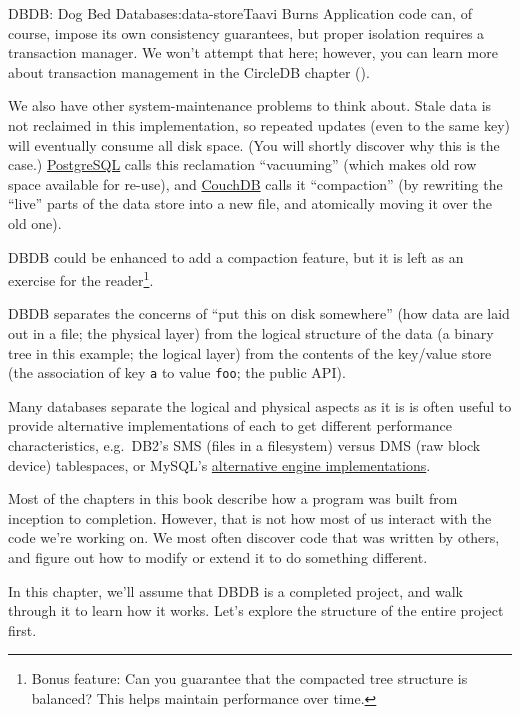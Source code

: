 \begin{aosachapter}{DBDB: Dog Bed Database}{s:data-store}{Taavi Burns}
Application code can, of course, impose its own consistency guarantees,
but proper isolation requires a transaction manager. We won't attempt
that here; however, you can learn more about transaction management in
the CircleDB chapter ().

We also have other system-maintenance problems to think about. Stale
data is not reclaimed in this implementation, so repeated updates (even
to the same key) will eventually consume all disk space. (You will
shortly discover why this is the case.)
\href{http://www.postgresql.org/}{PostgreSQL} calls this reclamation
``vacuuming'' (which makes old row space available for re-use), and
\href{http://couchdb.apache.org/}{CouchDB} calls it ``compaction'' (by
rewriting the ``live'' parts of the data store into a new file, and
atomically moving it over the old one).

DBDB could be enhanced to add a compaction feature, but it is left as an
exercise for the reader\footnote{Bonus feature: Can you guarantee that
  the compacted tree structure is balanced? This helps maintain
  performance over time.}.

\label{the-architecture-of-dbdb}

DBDB separates the concerns of ``put this on disk somewhere'' (how data
are laid out in a file; the physical layer) from the logical structure
of the data (a binary tree in this example; the logical layer) from the
contents of the key/value store (the association of key \texttt{a} to
value \texttt{foo}; the public API).

Many databases separate the logical and physical aspects as it is is
often useful to provide alternative implementations of each to get
different performance characteristics, e.g.~DB2's SMS (files in a
filesystem) versus DMS (raw block device) tablespaces, or MySQL's
\href{http://dev.mysql.com/doc/refman/5.7/en/storage-engines.html}{alternative
engine implementations}.

\label{discovering-the-design}

Most of the chapters in this book describe how a program was built from
inception to completion. However, that is not how most of us interact
with the code we're working on. We most often discover code that was
written by others, and figure out how to modify or extend it to do
something different.

In this chapter, we'll assume that DBDB is a completed project, and walk
through it to learn how it works. Let's explore the structure of the
entire project first.


\end{aosachapter}
